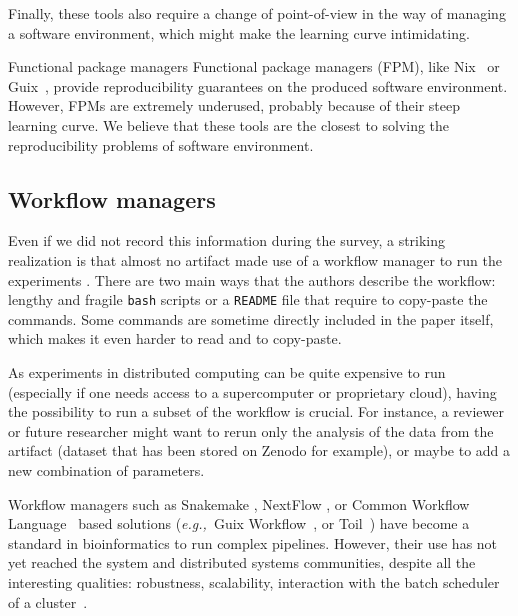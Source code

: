 \documentclass[sigconf,natbib=false]{acmart}
\newcommand{\eg}{\emph{e.g.,}}
\begin{document}
Finally, these tools also require a change of point-of-view in the way of managing a software environment, which might make the learning curve intimidating.

\begin{lesson}{Functional package managers}{}
  Functional package managers (FPM), like Nix\ \cite{dolstra_nix_2004} or Guix\ \cite{courtes_functional_2013}, provide reproducibility guarantees on the produced software environment.
  However, FPMs are extremely underused, probably because of their steep learning curve.
  We believe that these tools are the closest to solving the reproducibility problems of software environment.
\end{lesson}

\subsection{Workflow managers}\label{sec:sop:workflow}

Even if we did not record this information during the survey, a striking realization is that almost no artifact made use of a workflow manager to run the experiments .
There are two main ways that the authors describe the workflow: lengthy and fragile \texttt{bash} scripts or a \texttt{README} file that require to copy-paste the commands.
Some commands are sometime directly included in the paper itself, which makes it even harder to read and to copy-paste.

As experiments in distributed computing can be quite expensive to run (especially if one needs access to a supercomputer or proprietary cloud), having the possibility to run a subset of the workflow is crucial.
For instance, a reviewer or future researcher might want to rerun only the analysis of the data from the artifact (dataset that has been stored on Zenodo for example), or maybe to add a new combination of parameters. 

Workflow managers \cite{wratten2021reproducible} such as Snakemake \cite{koster2012snakemake}, NextFlow \cite{di2017nextflow}, or Common Workflow Language\ \cite{amstutz2016common} based solutions (\eg\ Guix Workflow\ \cite{strozzi2019scalable}, or Toil\ \cite{vivian2017toil}) have become a standard in bioinformatics to run complex pipelines.
However, their use has not yet reached the system and distributed systems communities, despite all the interesting qualities: robustness, scalability, interaction with the batch scheduler of a cluster\ \cite{snakemake-executor-plugin-slurm}.
\end{document}

